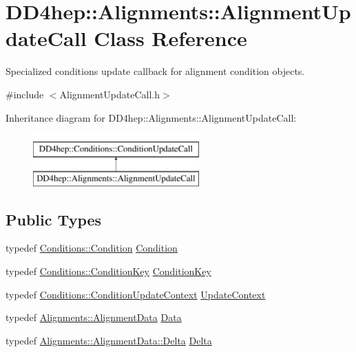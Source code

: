\hypertarget{class_d_d4hep_1_1_alignments_1_1_alignment_update_call}{}\section{D\+D4hep\+:\+:Alignments\+:\+:Alignment\+Update\+Call Class Reference}
\label{class_d_d4hep_1_1_alignments_1_1_alignment_update_call}


Specialized conditions update callback for alignment condition objects.  




{\ttfamily \#include $<$Alignment\+Update\+Call.\+h$>$}

Inheritance diagram for D\+D4hep\+:\+:Alignments\+:\+:Alignment\+Update\+Call\+:\begin{figure}[H]
\begin{center}
\leavevmode
\includegraphics[height=2.000000cm]{class_d_d4hep_1_1_alignments_1_1_alignment_update_call}
\end{center}
\end{figure}
\subsection*{Public Types}
\begin{DoxyCompactItemize}
\item 
typedef \hyperlink{class_d_d4hep_1_1_conditions_1_1_condition}{Conditions\+::\+Condition} \hyperlink{class_d_d4hep_1_1_alignments_1_1_alignment_update_call_ac41c367dd7b7027a76d7b691223927fd}{Condition}
\item 
typedef \hyperlink{class_d_d4hep_1_1_conditions_1_1_condition_key}{Conditions\+::\+Condition\+Key} \hyperlink{class_d_d4hep_1_1_alignments_1_1_alignment_update_call_a3c759edb169218bd8bc3b1c15d8af2e0}{Condition\+Key}
\item 
typedef \hyperlink{class_d_d4hep_1_1_conditions_1_1_condition_update_context}{Conditions\+::\+Condition\+Update\+Context} \hyperlink{class_d_d4hep_1_1_alignments_1_1_alignment_update_call_a648c995a6ab187911c79a687c8df0fa9}{Update\+Context}
\item 
typedef \hyperlink{class_d_d4hep_1_1_alignments_1_1_alignment_data}{Alignments\+::\+Alignment\+Data} \hyperlink{class_d_d4hep_1_1_alignments_1_1_alignment_update_call_af07241d13f0759c3a94c4589463cfb1b}{Data}
\item 
typedef \hyperlink{class_d_d4hep_1_1_alignments_1_1_alignment_data_a3e67a5cbb3449006e9552b0f7bd98d45}{Alignments\+::\+Alignment\+Data\+::\+Delta} \hyperlink{class_d_d4hep_1_1_alignments_1_1_alignment_update_call_a06a6522dece2daba45cdc69c079e144c}{Delta}
\end{DoxyCompactItemize}
